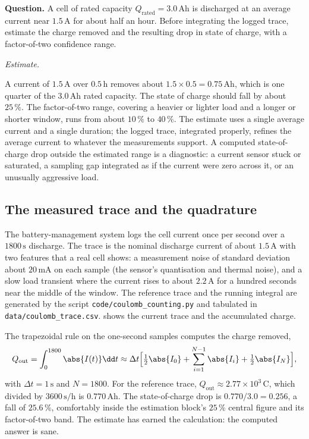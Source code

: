 \begin{estimation}
\textbf{Question.} A cell of rated capacity $Q_{\mathrm{rated}} =
3.0\,\si{\ampere\hour}$ is discharged at an average current near
$1.5\,\si{\ampere}$ for about half an hour. Before integrating the
logged trace, estimate the charge removed and the resulting drop in
state of charge, with a factor-of-two confidence range.

\smallskip
\textit{Estimate.}

\smallskip
A current of $1.5\,\si{\ampere}$ over $0.5\,\si{\hour}$ removes about
$1.5 \times 0.5 = 0.75\,\si{\ampere\hour}$, which is one quarter of
the $3.0\,\si{\ampere\hour}$ rated capacity. The state of charge
should fall by about $25\,\%$. The factor-of-two range, covering a
heavier or lighter load and a longer or shorter window, runs from
about $10\,\%$ to $40\,\%$. The estimate uses a single average current
and a single duration; the logged trace, integrated properly, refines
the average current to whatever the measurements support. A computed
state-of-charge drop outside the estimated range is a diagnostic: a
current sensor stuck or saturated, a sampling gap integrated as if the
current were zero across it, or an unusually aggressive load.
\end{estimation}

\subsection{The measured trace and the quadrature}

The battery-management system logs the cell current once per second
over a $1800\,\si{\second}$ discharge. The trace is the nominal
discharge current of about $1.5\,\si{\ampere}$ with two features that a
real cell shows: a measurement noise of standard deviation about
$20\,\si{\milli\ampere}$ on each sample (the sensor's quantisation and
thermal noise), and a slow load transient where the current rises to
about $2.2\,\si{\ampere}$ for a hundred seconds near the middle of the
window. The reference trace and the running integral are generated by
the script \texttt{code/coulomb\_counting.py} and tabulated in
\texttt{data/coulomb\_trace.csv}.
 shows the current trace and the
accumulated charge.



The trapezoidal rule on the one-second samples computes the charge
removed,
\[
Q_{\mathrm{out}} = \int_{0}^{1800} \abs{I(t)}\dd t \approx
\Delta t\Bigl[\tfrac{1}{2}\abs{I_{0}} + \sum_{i=1}^{N-1}\abs{I_{i}}
+ \tfrac{1}{2}\abs{I_{N}}\Bigr],
\]
with $\Delta t = 1\,\si{\second}$ and $N = 1800$. For the reference
trace, $Q_{\mathrm{out}} \approx 2.77\times 10^{3}\,\si{\coulomb}$,
which divided by $3600\,\si{\second\per\hour}$ is
$0.770\,\si{\ampere\hour}$. The state-of-charge drop is
$0.770/3.0 = 0.256$, a fall of $25.6\,\%$, comfortably inside the
estimation block's $25\,\%$ central figure and its factor-of-two band.
The estimate has earned the calculation: the computed answer is sane.

